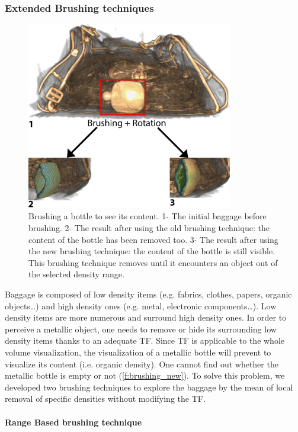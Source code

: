 \subsubsection{Extended Brushing techniques}

\begin{figure}
\centering   	\includegraphics[width=9cm]{Figures/brushing-new.png}
	\caption[Brushing a bottle to see its content.]{ Brushing a bottle to see its content.  1- The initial baggage before brushing. 2- The result after using the old brushing technique: the content of the bottle has been removed too. 3- The result after using the new brushing technique: the content of the bottle is still visible. This brushing technique removes until it encounters an object out of the selected density range. }
	\label{f:brushing_new}
\end{figure}

Baggage is composed of low density items (e.g. fabrics, clothes, papers, organic objects…) and high density ones (e.g. metal, electronic components…). Low density items are more numerous and surround high density ones. In order to perceive a metallic object, one needs to remove or hide its surrounding low density items thanks to an adequate TF. Since TF is applicable to the whole volume visualization, the visualization of a metallic bottle will prevent to visualize its content (i.e. organic density). One cannot find out whether the metallic bottle is empty or not (\autoref{f:brushing_new}). To solve this problem, we developed two brushing techniques to explore the baggage by the mean of local removal of specific densities without modifying the TF.

\paragraph{Range Based brushing technique}

